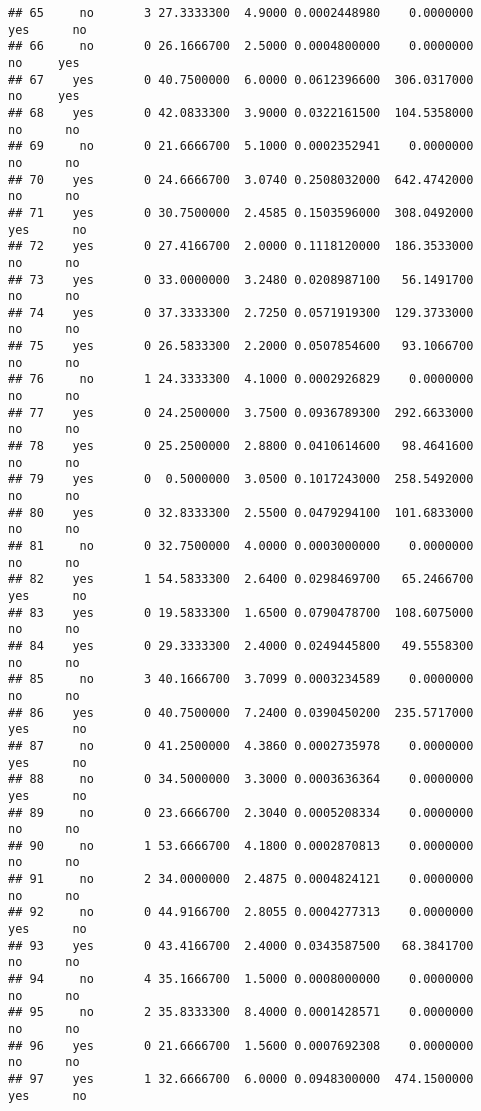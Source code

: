 \documentclass[]{article}
\begin{document}
\begin{verbatim}
## 65     no       3 27.3333300  4.9000 0.0002448980    0.0000000   yes      no
## 66     no       0 26.1666700  2.5000 0.0004800000    0.0000000    no     yes
## 67    yes       0 40.7500000  6.0000 0.0612396600  306.0317000    no     yes
## 68    yes       0 42.0833300  3.9000 0.0322161500  104.5358000    no      no
## 69     no       0 21.6666700  5.1000 0.0002352941    0.0000000    no      no
## 70    yes       0 24.6666700  3.0740 0.2508032000  642.4742000    no      no
## 71    yes       0 30.7500000  2.4585 0.1503596000  308.0492000   yes      no
## 72    yes       0 27.4166700  2.0000 0.1118120000  186.3533000    no      no
## 73    yes       0 33.0000000  3.2480 0.0208987100   56.1491700    no      no
## 74    yes       0 37.3333300  2.7250 0.0571919300  129.3733000    no      no
## 75    yes       0 26.5833300  2.2000 0.0507854600   93.1066700    no      no
## 76     no       1 24.3333300  4.1000 0.0002926829    0.0000000    no      no
## 77    yes       0 24.2500000  3.7500 0.0936789300  292.6633000    no      no
## 78    yes       0 25.2500000  2.8800 0.0410614600   98.4641600    no      no
## 79    yes       0  0.5000000  3.0500 0.1017243000  258.5492000    no      no
## 80    yes       0 32.8333300  2.5500 0.0479294100  101.6833000    no      no
## 81     no       0 32.7500000  4.0000 0.0003000000    0.0000000    no      no
## 82    yes       1 54.5833300  2.6400 0.0298469700   65.2466700   yes      no
## 83    yes       0 19.5833300  1.6500 0.0790478700  108.6075000    no      no
## 84    yes       0 29.3333300  2.4000 0.0249445800   49.5558300    no      no
## 85     no       3 40.1666700  3.7099 0.0003234589    0.0000000    no      no
## 86    yes       0 40.7500000  7.2400 0.0390450200  235.5717000   yes      no
## 87     no       0 41.2500000  4.3860 0.0002735978    0.0000000   yes      no
## 88     no       0 34.5000000  3.3000 0.0003636364    0.0000000   yes      no
## 89     no       0 23.6666700  2.3040 0.0005208334    0.0000000    no      no
## 90     no       1 53.6666700  4.1800 0.0002870813    0.0000000    no      no
## 91     no       2 34.0000000  2.4875 0.0004824121    0.0000000    no      no
## 92     no       0 44.9166700  2.8055 0.0004277313    0.0000000   yes      no
## 93    yes       0 43.4166700  2.4000 0.0343587500   68.3841700    no      no
## 94     no       4 35.1666700  1.5000 0.0008000000    0.0000000    no      no
## 95     no       2 35.8333300  8.4000 0.0001428571    0.0000000    no      no
## 96    yes       0 21.6666700  1.5600 0.0007692308    0.0000000    no      no
## 97    yes       1 32.6666700  6.0000 0.0948300000  474.1500000   yes      no

\end{verbatim}
\end{document}
